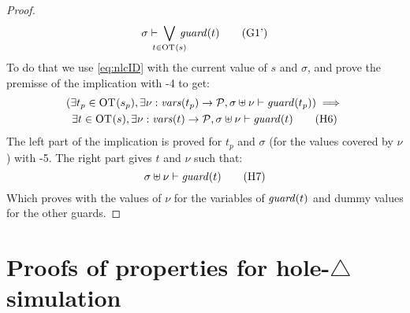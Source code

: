 \documentclass{article}
\begin{document}
\begin{proof}
	\[ \sigma \vdash \bigvee_\subbox{t \in \fOT{s}} \fguard{t} \goal{1'} \]
	To do that we use \eqref{eq:nlcID} with the current value of \(s\) and \(\sigma\), and prove the premisse of the implication with \hyp{4} to get:
	\begin{multline}
		\mpar{\exists t_p \in \fOT{s_p}, \exists \nu: \fvars{t_p} \to \values, \sigma \uplus \nu \vdash \fguard{t_p}} \implies \\
		\exists t \in \fOT{s}, \exists \nu: \fvars{t} \to \values, \sigma \uplus \nu \vdash \fguard{t} \hyp{6}
	\end{multline}
	The left part of the implication is proved for \(t_p\) and \(\sigma\) (for the values covered by \(\nu\)) with \hyp{5}.
	The right part gives \(t\) and \(\nu\) such that:
	\[ \sigma \uplus \nu \vdash \fguard{t} \hyp{7} \]
	Which proves  with the values of \(\nu\) for the variables of \(\mathit{guard}{\left(t\right)}\) and dummy values for the other guards.
\end{proof}


\section{Proofs of properties for hole-\(\triangle\) simulation}
\end{document}
